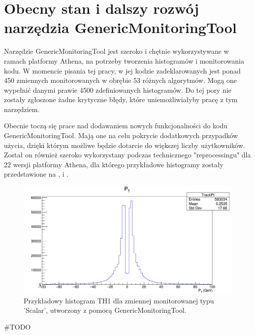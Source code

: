 \section{Obecny stan i dalszy rozwój narzędzia GenericMonitoringTool}
Narzędzie GenericMonitoringTool jest szeroko i chętnie wykorzystywane w ramach platformy Athena, na potrzeby tworzenia histogramów i monitorowania kodu.
W momencie pisania tej pracy, w jej kodzie zadeklarowanych jest ponad 450 zmiennych monitorowanych w obrębie 53 różnych algorytmów. 
Mogą one wypełnić danymi prawie 4500 zdefiniowanych histogramów.
Do tej pory nie zostały zgłoszone żadne krytyczne błędy, które uniemożliwiałyby pracę z tym narzędziem.

Obecnie toczą się prace nad dodawaniem nowych funkcjonalności do kodu GenericMonitoringTool.
Mają one na celu pokrycie dodatkowych przypadków użycia, dzięki którym możliwe będzie dotarcie do większej liczby użytkowników. 
Został on również szeroko wykorzystany podczas technicznego "reprocessingu" dla 22 wersji platformy Athena, dla którego przykładowe histogramy zostały przedstawione na ,  i .

\begin{figure}[!ht]
\centering
\includegraphics[width=1\textwidth]{img/histogram_TH1.png}
\caption{
Przykładowy histogram TH1 dla zmiennej monitorowanej typu 'Scalar', utworzony z pomocą GenericMonitoringTool.
}
\label{fig:athena:histogram_TH1}
\end{figure}

\begin{python}[caption=TH1 Scalar, label={lst:athena:histogram_TH1}]
#TODO
\end{python}

